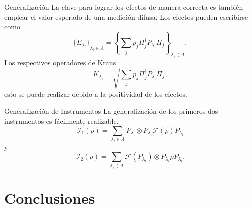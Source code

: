 \documentclass[svgnames,12pt,aspectratio=149]{beamer}
\newcommand{\tensor}{\otimes}
\newcommand{\fuzzy}[1]{\mathcal{F}\left(#1\right)}
\newcommand{\permutdagger}[2]{\Pi_{#1}^{\dagger}#2\Pi_{#1}}
\begin{document}
\begin{frame}{Generalización}
  La clave para lograr los efectos de manera correcta es también emplear el valor esperado de una medición difusa. Los efectos pueden escribirse como
  \begin{equation*}
      {\{E_{\lambda_i}\}}_{\lambda_i \in \Lambda}={\left\{\sum_{j} p_{j} \permutdagger{j}{P_{\lambda_i}}\right\}}_{\lambda_i \in \Lambda},
  \end{equation*}  
  Los respectivos operadores de Kraus 
  \begin{equation*}
     K_{\lambda_i}=\sqrt{\sum_{j} p_j \permutdagger{j}{P_{\lambda_i} }},
  \end{equation*} 
  esto se puede realizar debido a la positividad de los efectos.
\end{frame}


\begin{frame}{Generalización de Instrumentos}
  La generalización de los primeros dos instrumentos es fácilmente realizable.
\begin{equation*}
    \mathcal{I}_1(\rho)=\sum_{\lambda_i \in \Lambda }P_{\lambda_i}\otimes P_{\lambda_i}\fuzzy{\rho}P_{\lambda_i}
\end{equation*} 
y
\begin{equation*}
  \mathcal{I}_2(\rho)= \sum_{\lambda_i \in \Lambda } \fuzzy{P_{\lambda_i}}\tensor P_{\lambda_i}\rho P_{\lambda_i}.
\end{equation*} 





\end{frame}




\section{Conclusiones}
\end{document}
